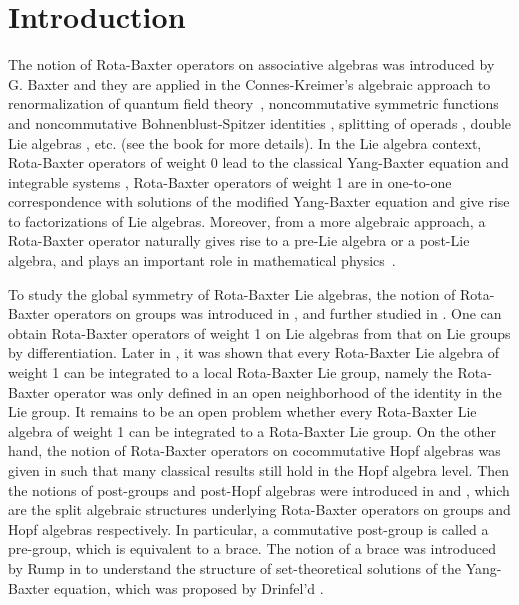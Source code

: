 \documentclass[12pt]{amsart}
\theoremstyle{definition}   %
\begin{document}
\maketitle

\tableofcontents
\section{Introduction}

The notion of Rota-Baxter operators on associative algebras was introduced by G. Baxter \cite{Bax} and they are applied in the
Connes-Kreimer's algebraic approach to renormalization of quantum
field theory~\cite{CK}, noncommutative
symmetric functions and noncommutative Bohnenblust-Spitzer identities \cite{Fard}, splitting of operads \cite{BBGN}, double Lie algebras \cite{GK},  etc. (see the book \cite{Gub} for more details).
In the Lie algebra context,  Rota-Baxter operators of weight 0 lead to the classical Yang-Baxter equation and integrable systems \cite{Bai,Ku}, Rota-Baxter operators of weight 1  are in one-to-one correspondence  with
solutions of the modified Yang-Baxter equation \cite{STS} and give rise to factorizations of Lie algebras. Moreover, from a more algebraic approach, a  Rota-Baxter operator naturally gives rise to a pre-Lie algebra or a post-Lie
algebra, and plays an important role in mathematical
physics~\cite{Aguiar,BGN}.


To study the global symmetry of Rota-Baxter Lie algebras, the notion of Rota-Baxter operators on groups was introduced in \cite{GLS}, and further studied in \cite{BG}. One can obtain Rota-Baxter operators of weight 1 on Lie algebras from that on Lie groups by differentiation. Later in \cite{JSZ}, it was shown that every Rota-Baxter Lie algebra of weight 1 can be integrated to a local
Rota-Baxter Lie group, namely the Rota-Baxter operator was only defined in an open neighborhood of the identity in the Lie group. It remains to be an open problem whether every Rota-Baxter Lie algebra of weight 1 can be integrated to a Rota-Baxter Lie group.
 On the other hand, the notion of  Rota-Baxter operators on cocommutative Hopf algebras  was given in  \cite{Goncharov} such that many classical results still hold in the Hopf algebra level. Then the notions of post-groups and post-Hopf algebras were introduced in \cite{BGST} and \cite{LST}, which are the split algebraic   structures underlying Rota-Baxter operators on groups and Hopf algebras respectively. In particular, a commutative post-group is called a pre-group, which is equivalent to a brace. The notion of a brace was introduced by Rump   in \cite{Rump1} to understand  the structure of set-theoretical solutions of the Yang-Baxter equation, which was proposed by Drinfel'd \cite{Dr}.
\end{document}
